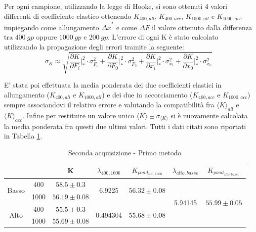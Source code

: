\documentclass[a4paper,11pt,oneside]{article}
\begin{document}
Per ogni campione, utilizzando la legge di Hooke, si sono ottenuti 4 valori differenti di coefficiente elastico ottenendo $K_{400, all}$, $K_{400, acc}$, $K_{1000, all}$ e $K_{1000, acc}$ impiegando come  allungamento ${\overline{\Delta x}}^\ast$ e come $\Delta F$ il valore ottenuto dalla differenza tra $\SI{400}{gp}$ oppure $\SI{1000}{gp} $ e $ \SI{200}{gp}$. L'errore di ogni K è stato calcolato utilizzando la propagazione degli errori tramite la seguente:
\begin{equation*}
\sigma_K \approx \sqrt{ \frac{\partial K }{\partial F_i} \Big|_{\ast}^2 \cdot  \sigma_{ F_i}^2 +
\frac{\partial K }{\partial F_0} \Big|_{\ast}^2\cdot  \sigma_{ F_0}^2 +
 \frac{\partial K }{\partial x_i}\Big|_{\ast}^2 \cdot  \sigma_{x_i}^2 +
 \frac{\partial K }{\partial x_0}\Big|_{\ast}^2\cdot  \sigma_{x_0} ^2 }
\end{equation*}

E' stata poi effettuata la media ponderata dei due coefficienti elastici in allungamento ($K_{400, all}$ e $K_{1000, all}$) e dei due in accorciamento ($K_{400, acc}$ e $K_{1000, acc}$) sempre associandovi il relativo errore e valutando la compatibilità fra ${\langle K \rangle}_{all}$ e ${\langle K \rangle}_{acc}$. Infine per restituire un valore unico $\langle K \rangle \pm \sigma_{\langle K \rangle}$ si è nuovamente calcolata la media ponderata fra questi due ultimi valori. Tutti i dati citati sono riportati in Tabella \ref{tab:2ac_1metodo}.\\


\begin{table}[h!]
\centering
\caption{Seconda acquisizione - Primo metodo}
\label{tab:2ac_1metodo}

    \begin{tabular}{|c|c|c|c|c|c|c|}
        \hline
        \multicolumn{2}{|c|}{}  & K &  $\lambda_{400, 1000}$ & $K_{pond_{400, 1000}}$ & $\lambda_{alto, basso}$  & $K_{pond_{alto, basso}}$ \\\hline
        \multirow{2}{*}{Basso} & {\cellcolor[rgb]{0.85,0.85,0.85}}400  & {\cellcolor[rgb]{0.85,0.85,0.85}}$58.5\pm0.3$  & \multirow{2}{*}{6.9225}   & \multirow{2}{*}{$56.32\pm0.08$} & \multirow{4}{*}{5.94145} & \multirow{4}{*}{$55.99\pm0.05$} \\\cline{2-3}
        & 1000 & $56.19\pm0.08$ &  &  &  & \\\cline{1-5}
        \multirow{2}{*}{Alto}  & {\cellcolor[rgb]{0.85,0.85,0.85}}400  & {\cellcolor[rgb]{0.85,0.85,0.85}}$55.5\pm0.3$  & \multirow{2}{*}{0.494304} & \multirow{2}{*}{$55.68\pm0.08$} & & \\\cline{2-3}
        & 1000 & $55.69\pm0.08$ &  &  &  &\\ \hline 
    \end{tabular}
\end{table}
\end{document}
